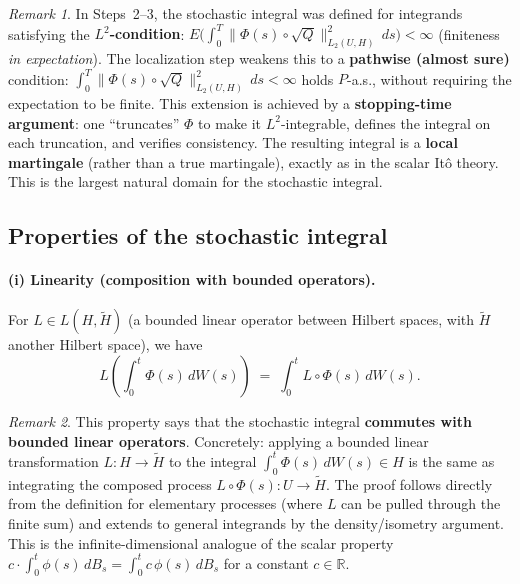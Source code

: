 \documentclass[11pt]{article}
\theoremstyle{definition}
\theoremstyle{remark}
\newtheorem{remark}{Remark}
\begin{document}
\begin{remark}
In Steps~2--3, the stochastic integral was defined for integrands satisfying the \textbf{$L^2$-condition}:
$E\!\bigl(\int_0^T \|\Phi(s) \circ \sqrt{Q}\|_{L_2(U,H)}^2\,ds\bigr) < \infty$
(finiteness \emph{in expectation}).
The localization step weakens this to a \textbf{pathwise (almost sure)} condition:
$\int_0^T \|\Phi(s) \circ \sqrt{Q}\|_{L_2(U,H)}^2\,ds < \infty$ holds $P$-a.s.,
without requiring the expectation to be finite.
This extension is achieved by a \textbf{stopping-time argument}: one ``truncates'' $\Phi$ to make it $L^2$-integrable, defines the integral on each truncation, and verifies consistency.
The resulting integral is a \textbf{local martingale} (rather than a true martingale), exactly as in the scalar It\^o theory.
This is the largest natural domain for the stochastic integral.
\end{remark}

\subsection*{Properties of the stochastic integral}

\paragraph{(i) Linearity (composition with bounded operators).}

For $L \in L(H, \widetilde{H})$ (a bounded linear operator between Hilbert spaces, with
$\widetilde{H}$ another Hilbert space), we have
\[
    L\!\left(\int_0^t \Phi(s)\,dW(s)\right)
    \;=\;
    \int_0^t L \circ \Phi(s)\,dW(s).
\]

\begin{remark}
This property says that the stochastic integral \textbf{commutes with bounded linear operators}.
Concretely: applying a bounded linear transformation $L \colon H \to \widetilde{H}$ to the integral $\int_0^t \Phi(s)\,dW(s) \in H$ is the same as integrating the composed process $L \circ \Phi(s) \colon U \to \widetilde{H}$.
The proof follows directly from the definition for elementary processes (where $L$ can be pulled through the finite sum) and extends to general integrands by the density/isometry argument.
This is the infinite-dimensional analogue of the scalar property $c \cdot \int_0^t \phi(s)\,dB_s = \int_0^t c\,\phi(s)\,dB_s$ for a constant $c \in \mathbb{R}$.
\end{remark}
\end{document}
